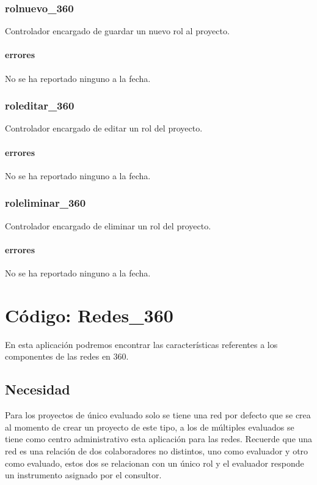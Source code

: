 \documentclass[10pt,a4paper]{book}
\begin{document}
	\subsection{rolnuevo\_360}
	Controlador encargado de guardar un nuevo rol al proyecto.
	\subsubsection{errores}
	No se ha reportado ninguno a la fecha.
	
	\subsection{roleditar\_360}
	Controlador encargado de editar un rol del proyecto.
	\subsubsection{errores}
	No se ha reportado ninguno a la fecha.
	
	\subsection{roleliminar\_360}
	Controlador encargado de eliminar un rol del proyecto.
	\subsubsection{errores}
	No se ha reportado ninguno a la fecha.


	\chapter{Código: Redes\_360}
	
	En esta aplicación podremos encontrar las características referentes a los componentes de las redes en 360.
	
	\section{Necesidad}
	
	Para los proyectos de único evaluado solo se tiene una red por defecto que se crea al momento de crear un proyecto de este tipo, a los de múltiples evaluados se tiene como centro administrativo esta aplicación para las redes. Recuerde que una red es una relación de dos colaboradores no distintos, uno como evaluador y otro como evaluado, estos dos se relacionan con un único rol y el evaluador responde un instrumento asignado por el consultor.
	
\end{document}
